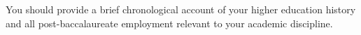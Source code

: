 You should provide a brief chronological account of your higher education history and all post-baccalaureate employment relevant to your academic discipline.
